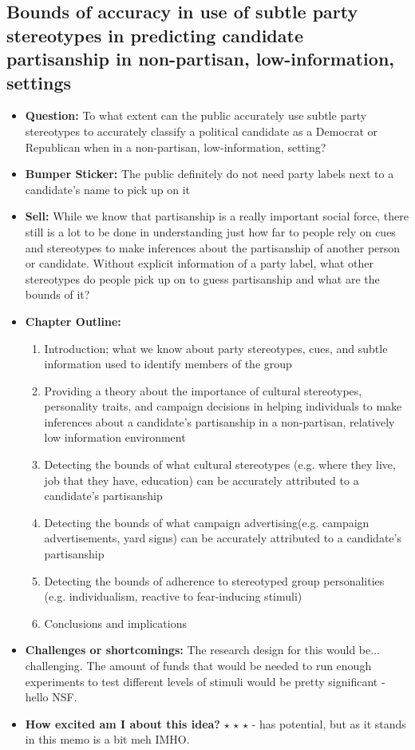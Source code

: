 \documentclass[12pt]{article}
\begin{document}
\subsection{Bounds of accuracy in use of subtle party stereotypes in predicting candidate partisanship in non-partisan, low-information, settings}
    \begin{itemize}
        \item \textbf{Question:} To what extent can the public accurately use subtle party stereotypes to accurately classify a political candidate as a Democrat or Republican when in a non-partisan, low-information, setting?
        \item \textbf{Bumper Sticker:} The public definitely do not need party labels next to a candidate's name to pick up on it
        \item \textbf{Sell:} While we know that partisanship is a really important social force, there still is a lot to be done in understanding just how far to people rely on cues and stereotypes to make inferences about the partisanship of another person or candidate. Without explicit information of a party label, what other stereotypes do people pick up on to guess partisanship and what are the bounds of it?
        \item \textbf{Chapter Outline:}
        \begin{enumerate}
            \item Introduction; what we know about party stereotypes, cues, and subtle information used to identify members of the group
            \item Providing a theory about the importance of cultural stereotypes, personality traits, and campaign decisions in helping individuals to make inferences about a candidate's partisanship in a non-partisan, relatively low information environment
            \item Detecting the bounds of what cultural stereotypes (e.g. where they live, job that they have, education) can be accurately attributed to a candidate's partisanship
            \item Detecting the bounds of what campaign advertising(e.g. campaign advertisements, yard signs) can be accurately attributed to a candidate's partisanship
            \item Detecting the bounds of adherence to stereotyped group personalities (e.g. individualism, reactive to fear-inducing stimuli)
            \item Conclusions and implications
        \end{enumerate}
        \item \textbf{Challenges or shortcomings:} The research design for this would be... challenging. The amount of funds that would be needed to run enough experiments to test different levels of stimuli would be pretty significant - hello NSF.
        \item \textbf{How excited am I about this idea?} $\star$ $\star$ $\star$ - has potential, but as it stands in this memo is a bit meh IMHO.
    \end{itemize}
\end{document}
